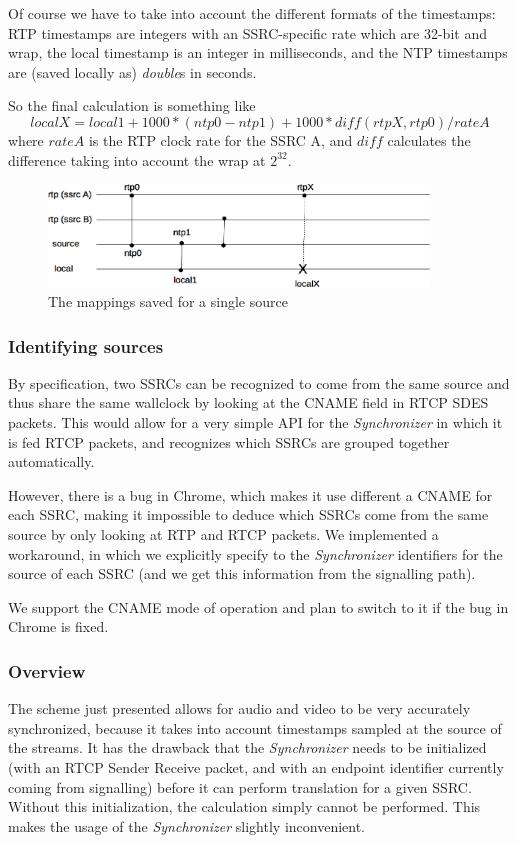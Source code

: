 \documentclass[twoside,openright,a4paper,12pt,english]{article}
\begin{document}
Of course we have to take into account the different formats of the timestamps:
RTP timestamps are integers with an SSRC-specific rate which are 32-bit and
wrap, the local timestamp is an integer in milliseconds, and the
NTP timestamps are (saved locally as) \emph{double}s in seconds.

So the final calculation is something like
$$localX = local1 + 1000 * (ntp0 - ntp1) + 1000 * diff(rtpX, rtp0) / rateA$$
where $rateA$ is the RTP clock rate for the SSRC A, and $diff$ calculates the difference taking into account the wrap at $2^{32}$.

\begin{figure}[h]
    \includegraphics[width=0.9\textwidth]{./pics/diagram-sync.eps}
    \caption{The mappings saved for a single source}
    \label{diagram-sync}
\end{figure}

\subsubsection{Identifying sources}
By specification, two SSRCs can be recognized to come from the same source and thus share the same
wallclock by looking at the CNAME field in RTCP SDES packets. This would allow for a very simple API for 
the \emph{Synchronizer} in which it is fed RTCP packets, and recognizes which
SSRCs are grouped together automatically. 

However, there is a bug in
Chrome\cite{chrome-cname-bug}, which
makes it use different a CNAME for each SSRC, making it impossible to deduce
which SSRCs come from the same source by only looking at RTP and RTCP packets.
We implemented a workaround, in which we explicitly specify to the
\emph{Synchronizer} identifiers for the source of each SSRC (and we get this
information from the signalling path).

We support the CNAME mode of operation and plan to switch to it if the bug in Chrome is fixed.

\subsubsection{Overview}
The scheme just presented allows for audio and video to be very accurately synchronized, because 
it takes into account timestamps sampled at the source of the streams. It has
the drawback that the \emph{Synchronizer} needs to be initialized (with an RTCP Sender Receive packet, and with an endpoint identifier currently coming from signalling) before it can
perform translation for a given SSRC. Without this initialization,
the calculation simply cannot be performed. This makes the usage of the
\emph{Synchronizer} slightly inconvenient.
\end{document}
